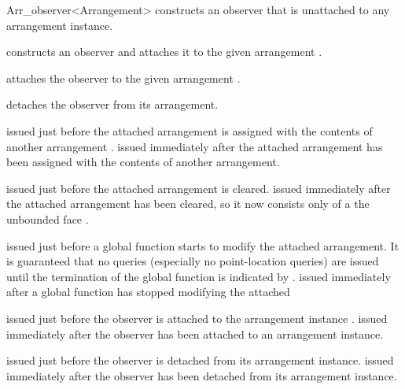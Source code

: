 \begin{ccRefClass}{Arr_observer<Arrangement>}
    {constructs an observer that is unattached to any arrangement instance.}
 
    {constructs an observer and attaches it to the given arrangement 
     .}

\ccModifiers

    {attaches the observer to the given arrangement .}

    {detaches the observer from its arrangement.}



    {issued just before the attached arrangement is assigned with the contents
     of another arrangement .}
\ccGlue
{}
    {issued immediately after the attached arrangement has been assigned with
     the contents of another arrangement.}

    {issued just before the attached arrangement is cleared.}
\ccGlue
{}
    {issued immediately after the attached arrangement has been cleared, so it
     now consists only of a the unbounded face .}

    {issued just before a global function starts to modify the attached
     arrangement. It is guaranteed that no queries (especially no 
     point-location queries) are issued until the termination of the global
     function is indicated by .}
\ccGlue
{}
    {issued immediately after a global function has stopped modifying the
     attached}


    {issued just before the observer is attached to the arrangement instance
     .}
\ccGlue
{}
    {issued immediately after the observer has been attached to an
     arrangement instance.}

    {issued just before the observer is detached from its arrangement instance.}
\ccGlue
{}
    {issued immediately after the observer has been detached from its
     arrangement instance.}


\end{ccRefClass}
